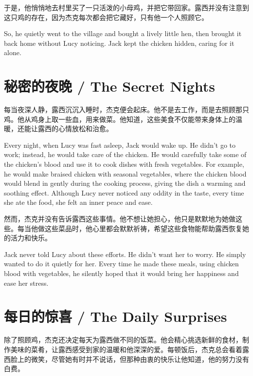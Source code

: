 于是，他悄悄地去村里买了一只活泼的小母鸡，并把它带回家。露西并没有注意到这只鸡的存在，因为杰克每次都会把它藏好，只有他一个人照顾它。

\begin{flushright}
So, he quietly went to the village and bought a lively little hen, then brought it back home without Lucy noticing. Jack kept the chicken hidden, caring for it alone.
\end{flushright}

\section*{秘密的夜晚 / The Secret Nights}

每当夜深人静，露西沉沉入睡时，杰克便会起床。他不是去工作，而是去照顾那只鸡。他从鸡身上取一些血，用来做菜。他知道，这些美食不仅能带来身体上的温暖，还能让露西的心情放松和治愈。

\begin{flushright}
Every night, when Lucy was fast asleep, Jack would wake up. He didn’t go to work; instead, he would take care of the chicken. He would carefully take some of the chicken's blood and use it to cook dishes with fresh vegetables. For example, he would make braised chicken with seasonal vegetables, where the chicken blood would blend in gently during the cooking process, giving the dish a warming and soothing effect. Although Lucy never noticed any oddity in the taste, every time she ate the food, she felt an inner peace and ease.
\end{flushright}

然而，杰克并没有告诉露西这些事情。他不想让她担心，他只是默默地为她做这些。每当他做这些菜品时，他心里都会默默祈祷，希望这些食物能帮助露西恢复她的活力和快乐。

\begin{flushright}
Jack never told Lucy about these efforts. He didn’t want her to worry. He simply wanted to do it quietly for her. Every time he made these meals, using chicken blood with vegetables, he silently hoped that it would bring her happiness and ease her stress.
\end{flushright}

\section*{每日的惊喜 / The Daily Surprises}

除了照顾鸡，杰克还决定每天为露西做不同的饭菜。他会精心挑选新鲜的食材，制作美味的菜肴，让露西感受到家的温暖和他深深的爱。每顿饭后，杰克总会看着露西脸上的微笑，尽管她有时并不说话，但那种由衷的快乐让他知道，他的努力没有白费。

